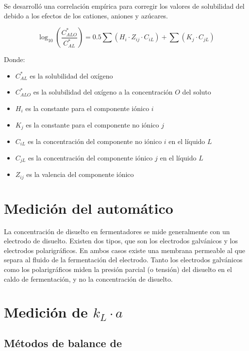 \documentclass{AsignaturaResumen}
\begin{document}
Se desarrolló una correlación empírica para corregir los valores de solubilidad del  debido a los efectos de los cationes, aniones y azúcares.

\begin{equation}
    \log_{10}\left(\frac{C_{ALO}^{\ast}}{C_{AL}^{\ast}}\right) = 0.5\sum(H_{i} \cdot Z_{ij} \cdot C_{iL}) + \sum(K_{j} \cdot C_{jL})
\end{equation}

Donde:

\begin{itemize}
    \item $C_{AL}^{\ast}$ es la solubilidad del oxígeno
    \item $C_{ALO}^{\ast}$ es la solubilidad del oxígeno a la concentración $O$ del soluto
    \item $H_{i}$ es la constante para el componente iónico $i$
    \item $K_{j}$ es la constante para el componente no iónico $j$
    \item $C_{iL}$ es la concentración del componente no iónico $i$ en el líquido $L$
    \item $C_{jL}$ es la concentración del componente iónico $j$ en el líquido $L$
    \item $Z_{ij}$ es la valencia del componente iónico
\end{itemize}



\section{Medición del  automático}

La concentración de  disuelto en fermentadores se mide generalmente con un electrodo de  disuelto. Existen dos tipos, que son los electrodos galvánicos y los electrodos polarigráficos. En ambos casos existe una membrana permeable al  que separa al fluido de la fermentación del electrodo. Tanto los electrodos galvánicos como los polarigráficos miden la presión parcial (o tensión) del  disuelto en el caldo de fermentación, y no la concentración de  disuelto.



\section{Medición de $k_{L} \cdot a$}

\subsection{Métodos de balance de }
\end{document}
